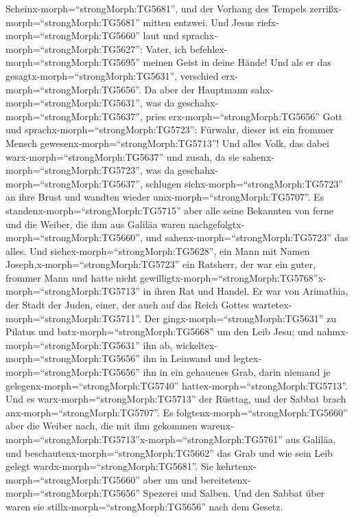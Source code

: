 Scheinx-morph=``strongMorph:TG5681'', und der Vorhang des Tempels
zerrißx-morph=``strongMorph:TG5681'' mitten entzwei.  Und
Jesus riefx-morph=``strongMorph:TG5660'' laut und
sprachx-morph=``strongMorph:TG5627'': Vater, ich
befehlex-morph=``strongMorph:TG5695'' meinen Geist in deine Hände! Und
als er das gesagtx-morph=``strongMorph:TG5631'', verschied
erx-morph=``strongMorph:TG5656''.  Da aber der Hauptmann
sahx-morph=``strongMorph:TG5631'', was da
geschahx-morph=``strongMorph:TG5637'', pries
erx-morph=``strongMorph:TG5656'' Gott und
sprachx-morph=``strongMorph:TG5723'': Fürwahr, dieser ist ein frommer
Mensch gewesenx-morph=``strongMorph:TG5713''!  Und alles
Volk, das dabei warx-morph=``strongMorph:TG5637'' und zusah, da sie
sahenx-morph=``strongMorph:TG5723'', was da
geschahx-morph=``strongMorph:TG5637'', schlugen
sichx-morph=``strongMorph:TG5723'' an ihre Brust und wandten wieder
umx-morph=``strongMorph:TG5707''.  Es
standenx-morph=``strongMorph:TG5715'' aber alle seine Bekannten von
ferne und die Weiber, die ihm aus Galiläa waren
nachgefolgtx-morph=``strongMorph:TG5660'', und
sahenx-morph=``strongMorph:TG5723'' das alles.  Und
siehex-morph=``strongMorph:TG5628'', ein Mann mit Namen
Joseph,x-morph=``strongMorph:TG5723'' ein Ratsherr, der war ein guter,
frommer Mann  und hatte nicht
gewilligtx-morph=``strongMorph:TG5768''x-morph=``strongMorph:TG5713'' in
ihren Rat und Handel. Er war von Arimathia, der Stadt der Juden, einer,
der auch auf das Reich Gottes wartetex-morph=``strongMorph:TG5711''.
 Der gingx-morph=``strongMorph:TG5631'' zu Pilatus und
batx-morph=``strongMorph:TG5668'' um den Leib Jesu;  und
nahmx-morph=``strongMorph:TG5631'' ihn ab,
wickeltex-morph=``strongMorph:TG5656'' ihn in Leinwand und
legtex-morph=``strongMorph:TG5656'' ihn in ein gehauenes Grab, darin
niemand je gelegenx-morph=``strongMorph:TG5740''
hattex-morph=``strongMorph:TG5713''.  Und es
warx-morph=``strongMorph:TG5713'' der Rüsttag, und der Sabbat brach
anx-morph=``strongMorph:TG5707''.  Es
folgtenx-morph=``strongMorph:TG5660'' aber die Weiber nach, die mit ihm
gekommen
warenx-morph=``strongMorph:TG5713''x-morph=``strongMorph:TG5761'' aus
Galiläa, und beschautenx-morph=``strongMorph:TG5662'' das Grab und wie
sein Leib gelegt wardx-morph=``strongMorph:TG5681''.  Sie
kehrtenx-morph=``strongMorph:TG5660'' aber um und
bereitetenx-morph=``strongMorph:TG5656'' Spezerei und Salben. Und den
Sabbat über waren sie stillx-morph=``strongMorph:TG5656'' nach dem
Gesetz.

